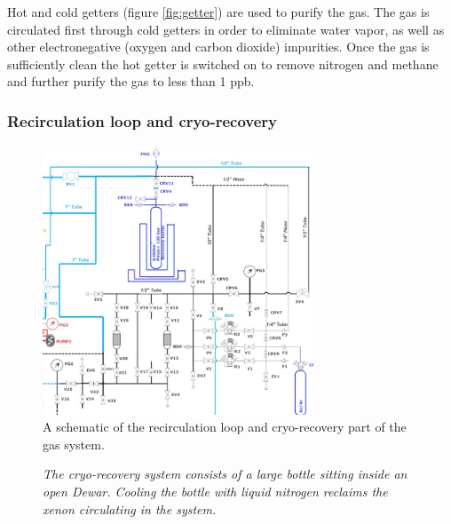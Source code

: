 Hot and cold getters (figure \ref{fig:getter}) are used to purify the gas. The gas is circulated first through cold getters in order to eliminate water vapor, as well as other electronegative (oxygen and carbon dioxide) impurities. Once the gas is sufficiently clean the hot getter is switched on to remove nitrogen and methane and further purify the gas to less than 1 ppb. 

\subsubsection*{Recirculation loop and cryo-recovery }

\begin{figure}[hpt!]
\centering
\includegraphics[height=8cm]{img2/Recirculation.png}
\caption{A schematic of the recirculation loop and cryo-recovery part of the gas system.} \label{fig.ct}
\end{figure}

\begin{figure}[hpt!]
    \bigskip
    \begin{center}\leavevmode
        \caption{\textit{The cryo-recovery system consists of a large bottle sitting inside an open Dewar. Cooling the bottle with liquid nitrogen reclaims the xenon circulating in the system.}}
        \label{fig.CB}
    \end{center}
\end{figure}

